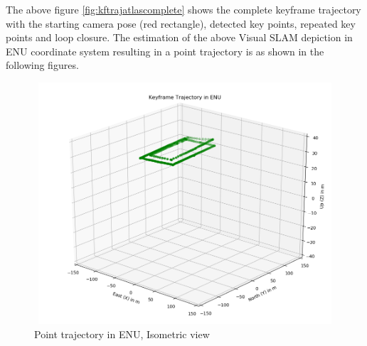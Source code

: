 The above figure \ref{fig:kftrajatlascomplete} shows the complete keyframe trajectory with the starting camera pose (red rectangle), detected key points, repeated key points and loop closure. The estimation of the above Visual SLAM depiction in ENU coordinate system resulting in a point trajectory is as shown in the following figures.

\begin{figure}[hbt!]
    \centering
    \includegraphics[height=9cm, width=13cm]{Images/kftrajectoryENUFinalIsometric.png}
    \caption{Point trajectory in ENU, Isometric view}
    \label{fig:kfgraphENUIsofinal}
\end{figure}

